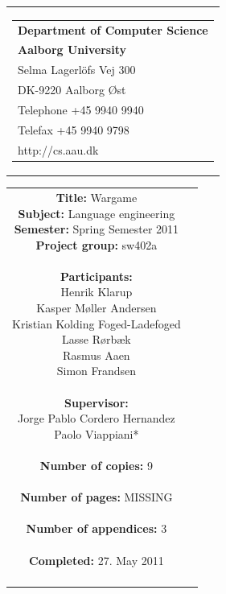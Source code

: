 \begin{nopagebreak}
\samepage 
\begin{tabular}{r}
\parbox{\textwidth}{
\hfill \parbox{6.2cm}{\begin{tabular}{l}
{\textsf\small \textbf{Department of Computer Science }}\\
{\textsf\small  \textbf{Aalborg University}}\\
{\textsf\small Selma Lagerlöfs Vej 300}\\
{\textsf\small DK-9220 Aalborg Øst}\\
{\textsf\small Telephone +45 9940 9940}\\
{\textsf\small Telefax +45 9940 9798}\\
{\textsf\small http://cs.aau.dk}
\end{tabular}}}
\end{tabular}

\begin{tabular}{cc}
\parbox{7cm}{
\textbf{Title:} 
Wargame\\
\textbf{Subject:} 
Language engineering \\
\textbf{Semester:} Spring Semester 2011\\
\textbf{Project group:} sw402a\\ \\
\textbf{Participants:} \\
Henrik Klarup \\
Kasper Møller Andersen \\
Kristian Kolding Foged-Ladefoged \\
Lasse Rørbæk \\
Rasmus Aaen \\
Simon Frandsen \\ \\
\textbf{Supervisor:} \\
Jorge Pablo Cordero Hernandez\\
Paolo Viappiani*\\ \\
\textbf{Number of copies:}
 9 \\ \\
\textbf{Number of pages:}
MISSING \\ \\
\textbf{Number of appendices:}
 3 \\ \\
\textbf{Completed:}
27. May 2011 \\ \\
}


\end{tabular}
\end{nopagebreak}
